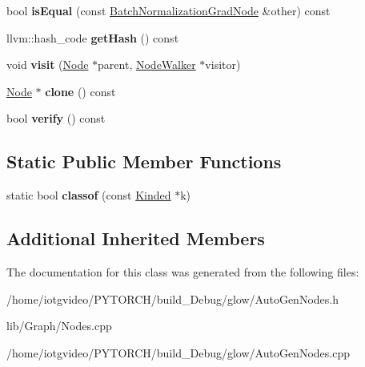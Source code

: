 \begin{DoxyCompactItemize}
bool {\bfseries is\+Equal} (const \hyperlink{classglow_1_1_batch_normalization_grad_node}{Batch\+Normalization\+Grad\+Node} \&other) const
\item 
\mbox{\label{classglow_1_1_batch_normalization_grad_node_a2197c6f3ad80d91a36df20b74f01ad03}} 
llvm\+::hash\+\_\+code {\bfseries get\+Hash} () const
\item 
\mbox{\label{classglow_1_1_batch_normalization_grad_node_ae0047a8798534df46a5bdf52e56061cc}} 
void {\bfseries visit} (\hyperlink{classglow_1_1_node}{Node} $\ast$parent, \hyperlink{classglow_1_1_node_walker}{Node\+Walker} $\ast$visitor)
\item 
\mbox{\label{classglow_1_1_batch_normalization_grad_node_a5362119eeb1a8f5fb32b1c846ddc97d7}} 
\hyperlink{classglow_1_1_node}{Node} $\ast$ {\bfseries clone} () const
\item 
\mbox{\label{classglow_1_1_batch_normalization_grad_node_a8c57679173401d027a6a90dec8cbe1ae}} 
bool {\bfseries verify} () const
\end{DoxyCompactItemize}
\subsection*{Static Public Member Functions}
\begin{DoxyCompactItemize}
\item 
\mbox{\label{classglow_1_1_batch_normalization_grad_node_ad361b5b5064e5fb65b17795400ad0f9c}} 
static bool {\bfseries classof} (const \hyperlink{classglow_1_1_kinded}{Kinded} $\ast$k)
\end{DoxyCompactItemize}
\subsection*{Additional Inherited Members}


The documentation for this class was generated from the following files\+:\begin{DoxyCompactItemize}
\item 
/home/iotgvideo/\+P\+Y\+T\+O\+R\+C\+H/build\+\_\+\+Debug/glow/Auto\+Gen\+Nodes.\+h\item 
lib/\+Graph/Nodes.\+cpp\item 
/home/iotgvideo/\+P\+Y\+T\+O\+R\+C\+H/build\+\_\+\+Debug/glow/Auto\+Gen\+Nodes.\+cpp\end{DoxyCompactItemize}

